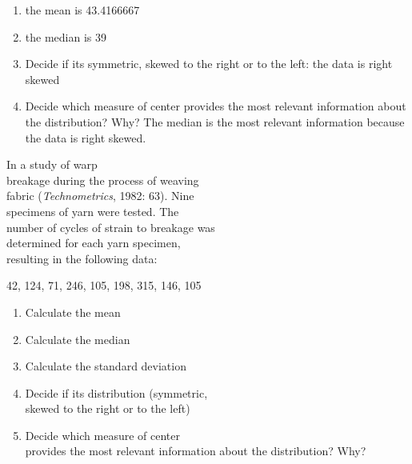 \documentclass[11pt]{book}\usepackage[]{graphicx}\usepackage[]{color}
\begin{document}
\begin{exercises}
\begin{exercise}
\end{exercise}
\begin{solution}  %

\begin{enumerate}
\item the mean is 43.4166667
\item the median is 39
\item Decide if its symmetric, skewed to the right or to the left: the data is right skewed
\item Decide which measure of center provides the most relevant information about the distribution? Why?  The median is the most relevant information because the data is right skewed.
\end{enumerate}

\end{solution}



\begin{exercise} %



In a study of warp \\ breakage during the process of weaving \\ fabric (\textit{Technometrics}, 1982: 63).  Nine \\ specimens of yarn were tested.  The \\ number of cycles of strain to breakage was \\ determined for each yarn specimen, \\ resulting in the following  data:

\vspace{3mm}

{\small{
42, 124, 71, 246, 105, 198, 315, 146, 105 
}}


\begin{enumerate}
\item Calculate the mean
\item Calculate the median
\item Calculate the standard deviation
\item Decide if its distribution (symmetric, \\ skewed to the right or to the left)
\item Decide which measure of center \\ provides the most relevant information about the distribution? Why?
\end{enumerate}

\end{exercise}
% 
% 


\end{exercises}
\end{document}
